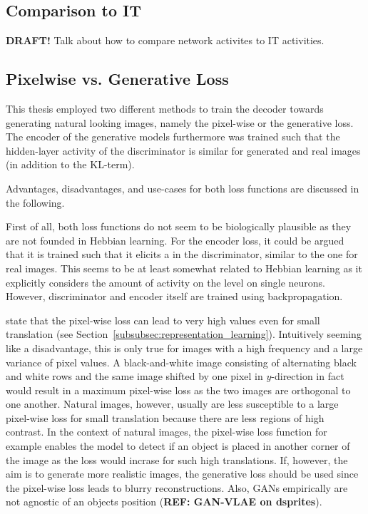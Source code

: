 \documentclass[11pt]{article}
\begin{document}
\subsection{Comparison to \ac{IT}}
\textbf{DRAFT!}
Talk about how to compare network activites to IT activities.

\subsection{Pixelwise vs. Generative Loss}
This thesis employed two different methods to train the decoder towards generating natural looking images, namely the pixel-wise or the generative loss.
The encoder of the generative models furthermore was trained such that the hidden-layer activity of the discriminator is similar for generated and real images (in addition to the KL-term).

Advantages, disadvantages, and use-cases for both loss functions are discussed in the following.

First of all, both loss functions do not seem to be biologically plausible as they are not founded in Hebbian learning.
For the encoder loss, it could be argued that it is trained such that it elicits a  in the discriminator, similar to the one for real images.
This  seems to be at least somewhat related to Hebbian learning as it explicitly considers the amount of activity on the level on single neurons.
However, discriminator and encoder itself are trained using backpropagation.

\citet{larsen2015autoencoding} state that the pixel-wise loss can lead to very high values even for small translation (see Section~\ref{subsubsec:representation_learning}).
Intuitively seeming like a disadvantage, this is only true for images with a high frequency and a large variance of pixel values.
A black-and-white image consisting of alternating black and white rows and the same image shifted by one pixel in $y$-direction in fact would result in a maximum pixel-wise loss as the two images are orthogonal to one another.
Natural images, however, usually are less susceptible to a large pixel-wise loss for small translation because there are less regions of high contrast.
In the context of natural images, the pixel-wise loss function for example enables the model to detect if an object is placed in another corner of the image as the loss would incrase for such high translations.
If, however, the aim is to generate more realistic images, the generative loss should be used since the pixel-wise loss leads to blurry reconstructions.
Also, \acp{GAN} empirically are not agnostic of an objects position (\textbf{REF: GAN-VLAE on dsprites}).
\end{document}
